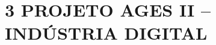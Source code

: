 \hypertarget{__RefHeading___Toc4767_3118176633}{}
\hypertarget{_Toc45627147}{}
\chapter*{3 PROJETO AGES II – INDÚSTRIA DIGITAL}
\label{ages-ii:text-h-0039}
